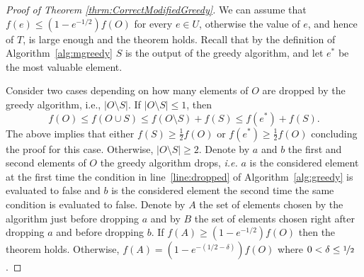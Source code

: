 \documentclass[a4paper,UKenglish,cleveref, autoref]{lipics-v2019}
\begin{document}

\begin{proof}[Proof of Theorem \ref{thrm:CorrectModifiedGreedy}]
	We can assume that $f(e) \leq (1 - e^{-1/2})f(O)$ for every $e \in U$, otherwise the value of $e$, and hence of $T$, is large enough and the theorem holds.
	Recall that by the definition of Algorithm~\ref{alg:mgreedy} $S$ is the output of the greedy algorithm, and let $e^*$ be the most valuable element.
	
	Consider two cases depending on how many elements of $O$ are dropped by the greedy algorithm, i.e., $|O \setminus S|$.
	If $|O \setminus S| \leq 1$, then
	$$
	f(O) \leq f(O \cup S) \leq f(O \setminus S) + f(S) \leq f(e^*) + f(S).
	$$
	The above implies that either $f(S) \geq \frac{1}{2}f(O)$ or $f(e^*) \geq \frac{1}{2}f(O)$ concluding the proof for this case.
	Otherwise, $|O \setminus S| \geq 2$.
	Denote by $a$ and $b$ the first and second elements of $O$ the greedy algorithm drops, {\em i.e.} $a$ is the considered element at the first time the condition in line~\ref{line:dropped} of Algorithm~\ref{alg:greedy} is evaluated to false and $b$ is the considered element the second time the same condition is evaluated to false.
	Denote by $A$ the set of elements chosen by the algorithm just before dropping $a$ and by
	$B$ the set of elements chosen right after dropping $a$ and before dropping $b$.
	If $f(A) \geq (1 - e^{-1/2})f(O)$ then the theorem holds.
	Otherwise, $f(A) = (1 - e^{-(1/2 - \delta)})f(O)$ where $0 < \delta \leq \nicefrac[]{1}{2}$.


\end{proof}
\end{document}
